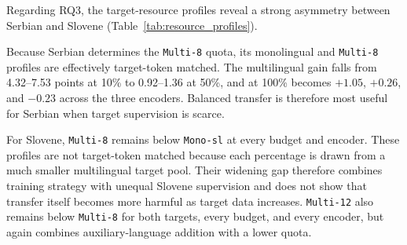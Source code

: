 \documentclass{article}
\begin{document}
Regarding RQ3, the target-resource profiles reveal a strong asymmetry between Serbian and Slovene (Table~\ref{tab:resource_profiles}).
\begin{table}[!htbp]
\centering
\caption{RQ3 relative-budget profiles. Cells give F1-point differences between language-level means over three seeds. Equal percentages use each configuration's own target pool. Only Serbian \texttt{Multi-8} versus \texttt{Mono} is effectively target-token matched.}
\label{tab:resource_profiles}
\end{table}
Because Serbian determines the \texttt{Multi-8} quota, its monolingual and \texttt{Multi-8} profiles are effectively target-token matched.
The multilingual gain falls from 4.32--7.53 points at 10\% to 0.92--1.36 at 50\%, and at 100\% becomes $+1.05$, $+0.26$, and $-0.23$ across the three encoders.
Balanced transfer is therefore most useful for Serbian when target supervision is scarce.

For Slovene, \texttt{Multi-8} remains below \texttt{Mono-sl} at every budget and encoder.
These profiles are not target-token matched because each percentage is drawn from a much smaller multilingual target pool.
Their widening gap therefore combines training strategy with unequal Slovene supervision and does not show that transfer itself becomes more harmful as target data increases.
\texttt{Multi-12} also remains below \texttt{Multi-8} for both targets, every budget, and every encoder, but again combines auxiliary-language addition with a lower quota.
\end{document}
